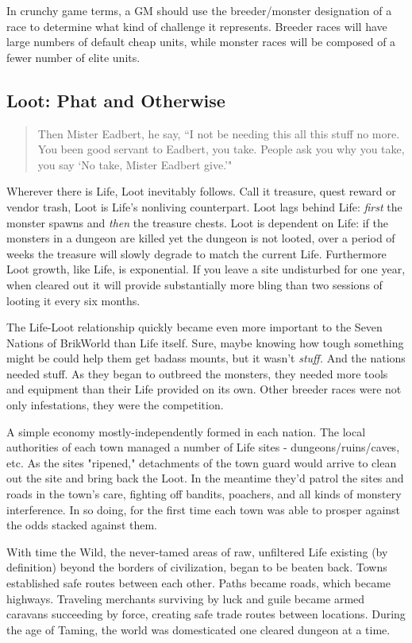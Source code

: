 \documentclass[12pt,a4paper,twocolumn]{article}
\begin{document}
In crunchy game terms, a GM should use the breeder/monster designation of a race to determine what kind of challenge it represents.  Breeder races will have large numbers of default cheap units, while monster races will be composed of a fewer number of elite units.
\subsection{Loot: Phat and Otherwise}
\begin{quote}
Then Mister Eadbert, he say, ``I not be needing this all this stuff no more.  You been good servant to Eadbert, you take.  People ask you why you take, you say `No take, Mister Eadbert give.'"
\end{quote}

Wherever there is Life, Loot inevitably follows.  Call it treasure, quest reward or vendor trash, Loot is Life's nonliving counterpart.  Loot lags behind Life: {\em first} the monster spawns and {\em then} the treasure chests.  Loot is dependent on Life: if the monsters in a dungeon are killed yet the dungeon is not looted, over a period of weeks the treasure will slowly degrade to match the current Life.  Furthermore Loot growth, like Life, is exponential.  If you leave a site undisturbed for one year, when cleared out it will provide substantially more bling than two sessions of looting it every six months.

The Life-Loot relationship quickly became even more important to the Seven Nations of BrikWorld than Life itself.  Sure, maybe knowing how tough something might be could help them get badass mounts, but it wasn't {\em stuff.}  And the nations needed stuff.  As they began to outbreed the monsters, they needed more tools and equipment than their Life provided on its own.  Other breeder races were not only infestations, they were the competition.

A simple economy mostly-independently formed in each nation.  The local authorities of each town managed a number of Life sites - dungeons/ruins/caves, etc.  As the sites "ripened," detachments of the town guard would arrive to clean out the site and bring back the Loot.  In the meantime they'd patrol the sites and roads in the town's care, fighting off bandits, poachers, and all kinds of monstery interference.  In so doing, for the first time each town was able to prosper against the odds stacked against them.

With time the Wild, the never-tamed areas of raw, unfiltered Life existing (by definition) beyond the borders of civilization, began to be beaten back.  Towns established safe routes between each other.  Paths became roads, which became highways.  Traveling merchants surviving by luck and guile became armed caravans succeeding by force, creating safe trade routes between locations.  During the age of Taming, the world was domesticated one cleared dungeon at a time.
\end{document}
